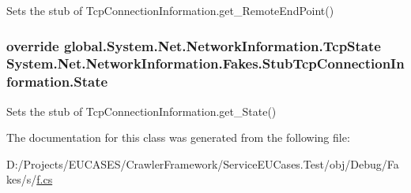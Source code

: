 Sets the stub of Tcp\-Connection\-Information.\-get\-\_\-\-Remote\-End\-Point()

\hypertarget{class_system_1_1_net_1_1_network_information_1_1_fakes_1_1_stub_tcp_connection_information_a16b9ef94ede821215bfb59d4dc411344}{
\subsubsection[{State}]{\setlength{\rightskip}{0pt plus 5cm}override global.\-System.\-Net.\-Network\-Information.\-Tcp\-State System.\-Net.\-Network\-Information.\-Fakes.\-Stub\-Tcp\-Connection\-Information.\-State\hspace{0.3cm}{\ttfamily [get]}}}\label{class_system_1_1_net_1_1_network_information_1_1_fakes_1_1_stub_tcp_connection_information_a16b9ef94ede821215bfb59d4dc411344}


Sets the stub of Tcp\-Connection\-Information.\-get\-\_\-\-State()



The documentation for this class was generated from the following file\-:\begin{DoxyCompactItemize}
\item 
D\-:/\-Projects/\-E\-U\-C\-A\-S\-E\-S/\-Crawler\-Framework/\-Service\-E\-U\-Cases.\-Test/obj/\-Debug/\-Fakes/s/\hyperlink{s_2f_8cs}{f.\-cs}\end{DoxyCompactItemize}
